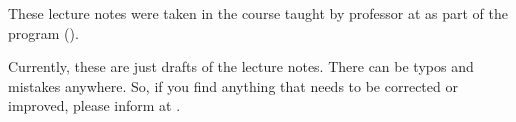 \begin{myminipage} 
     These lecture notes were taken in the course \textit{\courseloc} taught by professor \profloc{} at \instituteloc{} as part of the \classloc{} program (\sessionloc). \bigskip
     
     Currently, these are just drafts of the lecture notes. There can be typos and mistakes anywhere. So, if you find anything that needs to be corrected or improved, please inform at \myemailloc. \bigskip

\end{myminipage}
